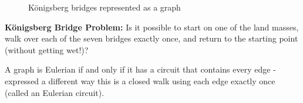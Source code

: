 \begin{minipage}{0.5\textwidth}
    \begin{figure}[H]
        \centering
        \caption{K\"{o}nigsberg bridges represented as a graph}
    \end{figure}
\end{minipage} \hfill
\begin{minipage}{0.45\textwidth}
\textbf{K\"{o}nigsberg Bridge Problem:} Is it possible to start on one of the land masses, walk over each of the seven bridges exactly once, and return to the starting point (without getting wet!)?
\end{minipage}\vspace{0.5em}

A graph is Eulerian if and only if it has a circuit that contains every edge - expressed a different way this is a closed walk using each edge exactly once (called an Eulerian circuit). 


